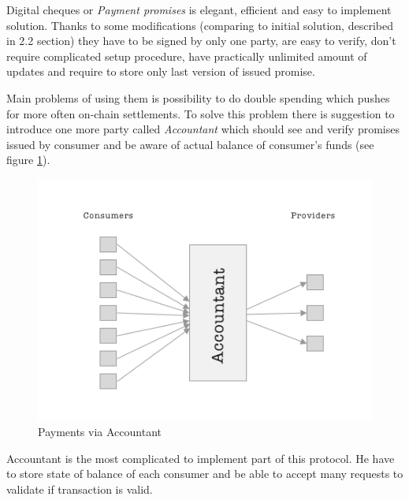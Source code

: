 \documentclass[a4paper,12pt]{article}
\begin{document}
Digital cheques or \textit{Payment promises} is elegant, efficient and easy to 
implement solution. Thanks to some modifications (comparing to initial solution,
described in 2.2 section) they have to be signed by only one party, are easy to 
verify, don't require complicated setup procedure, have practically unlimited 
amount of updates and require to store only last version of issued promise.

Main problems of using them is possibility to do double spending which pushes 
for more often on-chain settlements. To solve this problem there is suggestion 
to introduce one more party called \textit{Accountant} which should see and 
verify promises issued by consumer and be aware of actual balance of consumer's
funds (see figure \ref{img:unidirectional-payments}).

\begin{figure}[H]
    \centering
    \includegraphics[scale=0.5]{img/unidirectional-payments}
    \caption{Payments via Accountant}
    \label{img:unidirectional-payments}
\end{figure}

Accountant is the most complicated to implement part of this protocol. He have 
to store state of balance of each consumer and be able to accept many requests 
to validate if transaction is valid.
\end{document}
